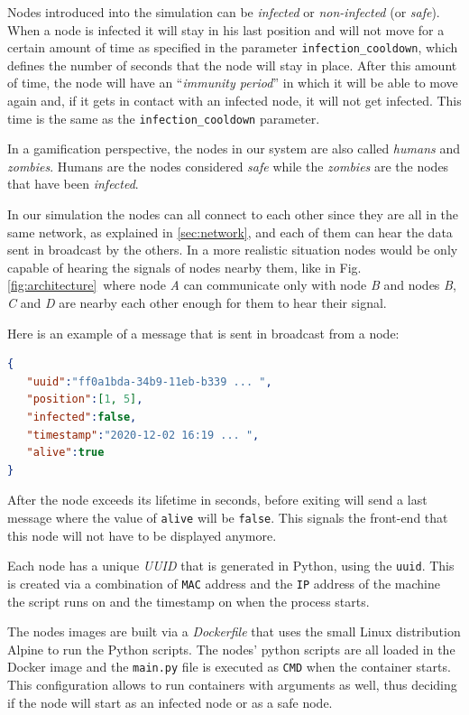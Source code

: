 \documentclass[conference]{IEEEtran}
\begin{document}
		Nodes introduced into the simulation can be \textit{infected} or \textit{non-infected} (or \textit{safe}).
		When a node is infected it will stay in his last position and will not move for a certain amount of time as specified in the parameter \texttt{infection\_cooldown}, which defines the number of seconds that the node will stay in place.
		After this amount of time, the node will have an ``\textit{immunity period}'' in which it will be able to move again and, if it gets in contact with an infected node, it will not get infected.
		This time is the same as the \texttt{infection\_cooldown} parameter.
		
		In a gamification perspective, the nodes in our system are also called \textit{humans} and \textit{zombies}. 
		Humans are the nodes considered \textit{safe} while the \textit{zombies} are the nodes that have been \textit{infected}.
		
		In our simulation the nodes can all connect to each other since they are all in the same network, as explained in \ref{sec:network}, and each of them can hear the data sent in broadcast by the others.
		In a more realistic situation nodes would be only capable of hearing the signals of nodes nearby them, like in Fig.\ref{fig:architecture}~where node \textit{A} can communicate only with node \textit{B} and nodes \textit{B}, \textit{C} and \textit{D} are nearby each other enough for them to hear their signal.

		Here is an example of a message that is sent in broadcast from a node:
		\begin{lstlisting}[language=json]
{  
   "uuid":"ff0a1bda-34b9-11eb-b339 ... ",
   "position":[1, 5],
   "infected":false,
   "timestamp":"2020-12-02 16:19 ... ",
   "alive":true
}  
		\end{lstlisting}
		
		After the node exceeds its lifetime in seconds, before exiting will send a last message where the value of \texttt{alive} will be \texttt{false}.
		This signals the front-end that this node will not have to be displayed anymore.
		
		Each node has a unique \textit{UUID} that is generated in Python, using the \texttt{uuid}\cite{uuid}.
		This is created via a combination of \texttt{MAC} address and the \texttt{IP} address of the machine the script runs on and the timestamp on when the process starts.

		The nodes images are built via a \textit{Dockerfile} that uses the small Linux distribution Alpine to run the Python scripts.
		The nodes' python scripts are all loaded in the Docker image and the \texttt{main.py} file is executed as \texttt{CMD} when the container starts.
		This configuration allows to run containers with arguments as well, thus deciding if the node will start as an infected node or as a safe node.
	
\end{document}
